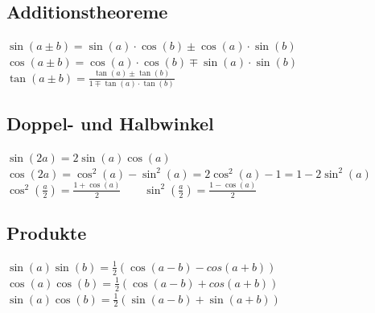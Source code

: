 \begin{minipage}[t]{9cm}
	\subsection{Additionstheoreme}
		$\sin(a \pm b)=\sin(a) \cdot \cos(b) \pm \cos(a) \cdot \sin(b)$\\
		$\cos(a \pm b)=\cos(a) \cdot \cos(b) \mp \sin(a) \cdot \sin(b)$\\	
		$\tan(a \pm b)=\frac{\tan(a) \pm \tan(b)}{1 \mp \tan(a) \cdot \tan(b)}$
		
	\subsection{Doppel- und Halbwinkel}	
		$\sin(2a)=2\sin(a)\cos(a)$\\
		$\cos(2a)=\cos^2(a)-\sin^2(a)=2\cos^2(a)-1=1-2\sin^2(a)$\\
		$\cos^2 \left(\frac{a}{2}\right)=\frac{1+\cos(a)}{2} \qquad
		\sin^2 \left(\frac{a}{2}\right)=\frac{1-\cos(a)}{2}$
		
	\subsection{Produkte}
			$\sin(a)\sin(b)=\frac{1}{2}(\cos(a-b)-cos(a+b))$\\
			$\cos(a)\cos(b)=\frac{1}{2}(\cos(a-b)+cos(a+b))$\\
			$\sin(a)\cos(b)=\frac{1}{2}(\sin(a-b)+\sin(a+b))$	
\end{minipage}
